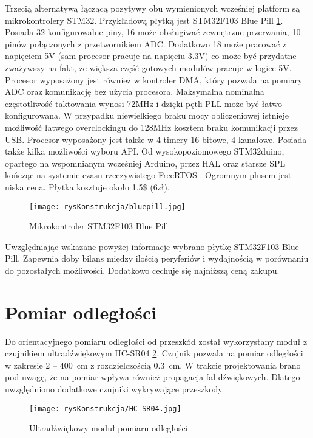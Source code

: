 		Trzecią alternatywą łączącą pozytywy obu wymienionych wcześniej platform są mikrokontrolery STM32. Przykładową płytką jest STM32F103 Blue Pill \ref{fig:bluepillPlytka}. Posiada 32 konfigurowalne piny, 16 może obsługiwać zewnętrzne przerwania, 10 pinów połączonych z przetwornikiem ADC. Dodatkowo 18 może pracować z napięciem 5V (sam procesor pracuje na napięciu 3.3V) co może być przydatne zważywszy na fakt, że większa część gotowych modułów pracuje w logice 5V. Procesor wyposażony jest również w kontroler DMA, który pozwala na pomiary ADC oraz komunikację bez użycia procesora. Maksymalna nominalna częstotliwość taktowania wynosi 72MHz i dzięki pętli PLL może być łatwo konfigurowana. W przypadku niewielkiego braku mocy obliczeniowej istnieje możliwość łatwego overclockingu do 128MHz kosztem braku komunikacji przez USB. Procesor wyposażony jest także w 4 timery 16-bitowe, 4-kanałowe. Posiada także kilka możliwości wyboru API. Od wysokopoziomowego STM32duino, opartego na wspomnianym wcześniej Arduino, przez HAL oraz starsze SPL kończąc na systemie czasu rzeczywistego FreeRTOS \cite{FreeRTOS}. Ogromnym plusem jest niska cena. Płytka kosztuje około 1.5\$ (6zł).
	
		\begin{figure}[h]
			\centering
			\texttt{[image: rysKonstrukcja/bluepill.jpg]} 
			\caption{Mikrokontroler STM32F103 Blue Pill}
			\label{fig:bluepillPlytka}
		\end{figure}
		
		Uwzględniając wskazane powyżej informacje wybrano płytkę STM32F103 Blue Pill. Zapewnia doby bilans między ilością peryferiów i wydajnością w porównaniu do pozostałych możliwości. Dodatkowo cechuje się najniższą ceną zakupu.
		
	\section{Pomiar odległości}
		
		Do orientacyjnego pomiaru odległości od przeszkód został wykorzystany moduł z czujnikiem ultradźwiękowym HC-SR04 \ref{fig:HCSR04}. Czujnik pozwala na pomiar odległości w zakresie \SI{2}{} --  \SI{400}{\centi\meter} z rozdzielczością \SI{0.3}{\centi\meter}. W trakcie projektowania brano pod uwagę, że na pomiar wpływa również propagacja fal dźwiękowych. Dlatego uwzględniono dodatkowe czujniki wykrywające przeszkody.
		
		\begin{figure}[H]
			\centering
			\texttt{[image: rysKonstrukcja/HC-SR04.jpg]} 
			\caption{Ultradźwiękowy moduł pomiaru odległości}
			\label{fig:HCSR04}
		\end{figure}
	
